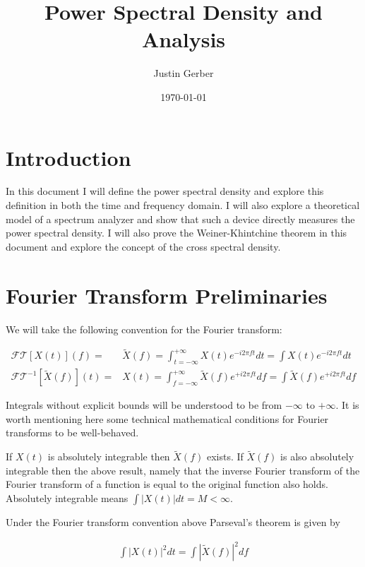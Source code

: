 \documentclass[12pt]{article}
\begin{document}
\title{Power Spectral Density and Analysis}
\author{Justin Gerber}
\date{\today}
\maketitle

\section{Introduction}
In this document I will define the power spectral density and explore this definition in both the time and frequency domain. I will also explore a theoretical model of a spectrum analyzer and show that such a device directly measures the power spectral density. I will also prove the Weiner-Khintchine theorem in this document and explore the concept of the cross spectral density.

\section{Fourier Transform Preliminaries}

We will take the following convention for the Fourier transform:

\begin{align}
\mathcal{FT}\left[X(t)\right](f) =& \tilde{X}(f) = \int_{t=-\infty}^{+\infty} X(t) e^{-i2\pi f t} dt = \int X(t)e^{-i2\pi ft} dt\\
\mathcal{FT}^{-1}\left[\tilde{X}(f)\right](t) =& X(t) = \int_{f=-\infty}^{+\infty} \tilde{X}(f) e^{+i2\pi f t} df = \int \tilde{X}(f) e^{+i2\pi f t} df
\end{align}

Integrals without explicit bounds will be understood to be from $-\infty$ to $+\infty$.
It is worth mentioning here some technical mathematical conditions for Fourier transforms to be well-behaved. 

If $X(t)$ is absolutely integrable then $\tilde{X}(f)$ exists. 
If $\tilde{X}(f)$ is also absolutely integrable then the above result, namely that the inverse Fourier transform of the Fourier transform of a function is equal to the original function also holds.
Absolutely integrable means $\int |X(t)| dt = M < \infty$.

Under the Fourier transform convention above Parseval's theorem is given by

\begin{align}
\int |X(t)|^2 dt = \int |\tilde{X}(f)|^2 df
\end{align}
\end{document}
